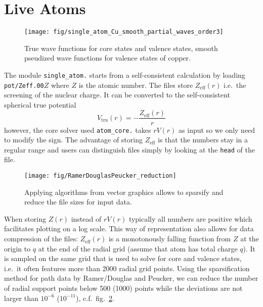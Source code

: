 \documentclass[oribibl]{llncs}
\newcommand{\um}[1]{_{\mathrm{#1}}}
\newcommand{\ttt}[1]{\texttt{#1}}
\begin{document}
\section{Live Atoms} \label{sec:live_atoms}
%
\begin{figure}
  \begin{minipage}[c]{.990\textwidth}
	\texttt{[image: fig/single\_atom\_Cu\_smooth\_partial\_waves\_order3]} %
  \end{minipage}\hfill
  \begin{minipage}[c]{.009\textwidth}
  \end{minipage}
  \label{fig:single_atom_Cu}
  \caption{
	True wave functions for core states and valence states, 
	smooth pseudized wave functions for valence states of copper.
  }
\end{figure}
%
%
The module \ttt{single\_atom.} starts from a self-consistent calculation by loading 
\ttt{pot/Zeff.00}$Z$ where $Z$ is the atomic number.
The files store $Z\um{eff}(r)$ i.e.~the screening of the nuclear charge.
It can be converted to the self-consistent spherical true potential
\begin{equation}
	V\um{tru}(r) = -\frac{Z\um{eff}(r)}{r}
\end{equation}
however, the core solver used \ttt{atom\_core.} takes $rV(r)$ as input so
we only need to modify the sign.
The advantage of storing $Z\um{eff}$ is that the numbers stay in a regular range
and users can distinguish files simply by looking at the \ttt{head} of the file.
%
\begin{figure}
  \begin{minipage}[c]{.990\textwidth}
	\texttt{[image: fig/RamerDouglasPeucker\_reduction]} %
  \end{minipage}\hfill
  \begin{minipage}[c]{.009\textwidth}
  \end{minipage}
  \label{fig:RamerDouglasPeucker_reduction}
  \caption{
	Applying algorithms from vector graphics allows to sparsify and reduce 
	the file sizes for input data.
  }
\end{figure}
%
When storing $Z(r)$ instead of $rV(r)$ typically all numbers are positive 
which facilitates plotting on a log scale.
This way of representation also allows for data compression of the files:
$Z\um{eff}(r)$ is a monotonously falling function from $Z$ at the origin to $q$ at the
end of the radial grid (assume that atom has total charge $q$).
It is sampled on the same grid that is used to solve for core and valence states,
i.e.~it often features more than 2000 radial grid points.
Using the sparsification method for path data by Ramer/Douglas and Peucker,
we can reduce the number of radial support points below 500 (1000) points while
the deviations are not larger than $10^{-6}$ ($10^{-11}$), 
c.f.~fig.~\ref{fig:RamerDouglasPeucker_reduction}.
\end{document}
